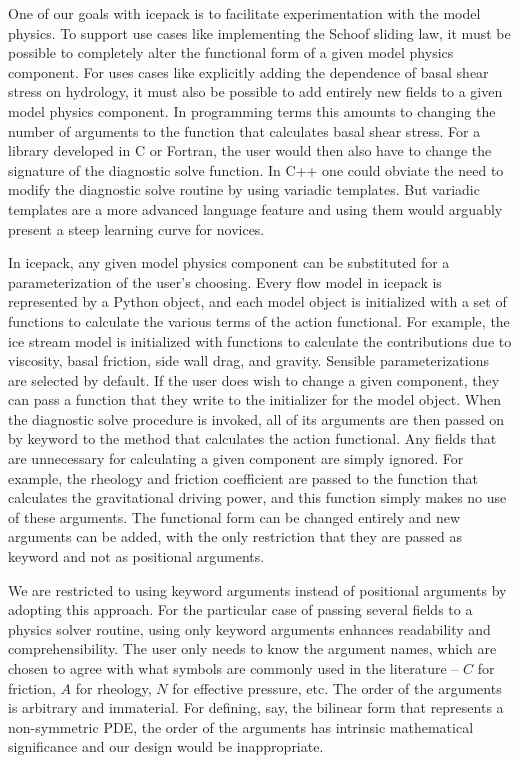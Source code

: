 \documentclass{article}
\theoremstyle{definition}
\theoremstyle{plain}
\begin{document}
One of our goals with icepack is to facilitate experimentation with the model physics.
To support use cases like implementing the Schoof sliding law, it must be possible to completely alter the functional form of a given model physics component.
For uses cases like explicitly adding the dependence of basal shear stress on hydrology, it must also be possible to add entirely new fields to a given model physics component.
In programming terms this amounts to changing the number of arguments to the function that calculates basal shear stress.
For a library developed in C or Fortran, the user would then also have to change the signature of the diagnostic solve function.
In C++ one could obviate the need to modify the diagnostic solve routine by using variadic templates.
But variadic templates are a more advanced language feature and using them would arguably present a steep learning curve for novices.

In icepack, any given model physics component can be substituted for a parameterization of the user's choosing.
Every flow model in icepack is represented by a Python object, and each model object is initialized with a set of functions to calculate the various terms of the action functional.
For example, the ice stream model is initialized with functions to calculate the contributions due to viscosity, basal friction, side wall drag, and gravity.
Sensible parameterizations are selected by default.
If the user does wish to change a given component, they can pass a function that they write to the initializer for the model object.
When the diagnostic solve procedure is invoked, all of its arguments are then passed on by keyword to the method that calculates the action functional.
Any fields that are unnecessary for calculating a given component are simply ignored.
For example, the rheology and friction coefficient are passed to the function that calculates the gravitational driving power, and this function simply makes no use of these arguments.
The functional form can be changed entirely and new arguments can be added, with the only restriction that they are passed as keyword and not as positional arguments.

We are restricted to using keyword arguments instead of positional arguments by adopting this approach.
For the particular case of passing several fields to a physics solver routine, using only keyword arguments enhances readability and comprehensibility.
The user only needs to know the argument names, which are chosen to agree with what symbols are commonly used in the literature -- $C$ for friction, $A$ for rheology, $N$ for effective pressure, etc.
The order of the arguments is arbitrary and immaterial.
For defining, say, the bilinear form that represents a non-symmetric PDE, the order of the arguments has intrinsic mathematical significance and our design would be inappropriate.
\end{document}
